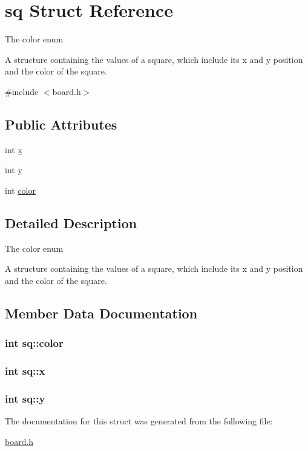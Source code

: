 \hypertarget{structsq}{\section{sq Struct Reference}
\label{structsq}
}


The color enum

A structure containing the values of a square, which include its x and y position and the color of the square.  




{\ttfamily \#include $<$board.\-h$>$}

\subsection*{Public Attributes}
\begin{DoxyCompactItemize}
\item 
int \hyperlink{structsq_aed5c1efc6e43c1bf7a230b8b8a373368}{x}
\item 
int \hyperlink{structsq_a1b0e5a26db37d818cb634406f2314293}{y}
\item 
int \hyperlink{structsq_a9456cfcbc3cb1beec5d3254091afa355}{color}
\end{DoxyCompactItemize}


\subsection{Detailed Description}
The color enum

A structure containing the values of a square, which include its x and y position and the color of the square. 

\subsection{Member Data Documentation}
\hypertarget{structsq_a9456cfcbc3cb1beec5d3254091afa355}{
\subsubsection[{color}]{\setlength{\rightskip}{0pt plus 5cm}int sq\-::color}}\label{structsq_a9456cfcbc3cb1beec5d3254091afa355}
\hypertarget{structsq_aed5c1efc6e43c1bf7a230b8b8a373368}{
\subsubsection[{x}]{\setlength{\rightskip}{0pt plus 5cm}int sq\-::x}}\label{structsq_aed5c1efc6e43c1bf7a230b8b8a373368}
\hypertarget{structsq_a1b0e5a26db37d818cb634406f2314293}{
\subsubsection[{y}]{\setlength{\rightskip}{0pt plus 5cm}int sq\-::y}}\label{structsq_a1b0e5a26db37d818cb634406f2314293}


The documentation for this struct was generated from the following file\-:\begin{DoxyCompactItemize}
\item 
\hyperlink{board_8h}{board.\-h}\end{DoxyCompactItemize}
